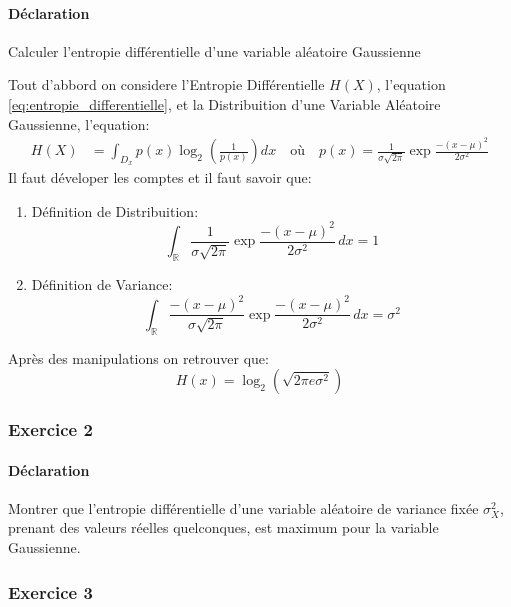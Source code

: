 \documentclass{article}
\begin{document}
\paragraph{Déclaration}Calculer l'entropie différentielle d'une variable aléatoire Gaussienne
\begin{resolution}
Tout d'abbord on considere l'Entropie Différentielle $H(X)$, l'equation \ref{eq:entropie_differentielle}, et la Distribuition d'une Variable Aléatoire Gaussienne, l'equation:
\begin{align*}
    H(X) &= \int_{D_x} p(x) \log_{2} \left( \frac{1}{p(x)} \right) dx
    \quad\text{où}\quad
    p(x) = \frac{1}{\sigma\sqrt{2\pi}} \exp{\frac{-(x - \mu)^2}{2\sigma^2}}
\end{align*}
Il faut déveloper les comptes et il faut savoir que:
\begin{enumerate}
    \item Définition de Distribuition:
    \begin{equation}
        \int_{\mathbb{R}} \frac{1}{\sigma\sqrt{2\pi}} \exp{\frac{-(x - \mu)^2}{2\sigma^2}}\,dx = 1
    \end{equation}
    \item Définition de Variance:
    \begin{equation}
        \int_{\mathbb{R}} \frac{-(x - \mu)^2}{\sigma\sqrt{2\pi}} \exp{\frac{-(x - \mu)^2}{2\sigma^2}}\,dx = \sigma^2
    \end{equation}
\end{enumerate}
Après des manipulations on retrouver que:
\begin{equation}
    \boxed{
        H(x) = \log_{2} (\sqrt{2\pi e \sigma^2})
    }
\end{equation}
\end{resolution}

\subsubsection{Exercice 2}
\paragraph{Déclaration}Montrer que l'entropie différentielle d'une variable aléatoire de variance fixée $\sigma_{X}^{2}$, prenant des valeurs réelles quelconques, est maximum pour la variable Gaussienne.
\begin{resolution}
    
\end{resolution}

\subsubsection{Exercice 3}
\begin{resolution}
    
\end{resolution}
\end{document}
